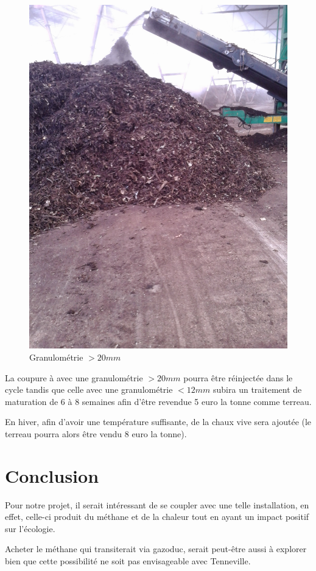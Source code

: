 \documentclass{article}
\begin{document}
\begin{figure}
  \centering
  \includegraphics[scale=0.07]{IMG_20141105_103019.jpg}
  \caption{Granulométrie $> \unit{20}{mm}$}
  \label{fig:granumore20}
\end{figure}
La coupure à avec une granulométrie $> \unit{20}{mm}$ pourra être réinjectée dans le cycle tandis que celle avec une granulométrie $< \unit{12}{mm}$ subira un traitement de maturation de 6 à 8 semaines afin d'être revendue 5 euro la tonne comme terreau.

En hiver, afin d'avoir une température suffisante, de la chaux vive sera ajoutée (le terreau pourra alors être vendu 8 euro la tonne).
\section{Conclusion}
Pour notre projet, il serait intéressant de se coupler avec une telle installation, en effet, celle-ci produit du méthane et de la chaleur tout en ayant un impact positif sur l'écologie.

Acheter le méthane qui transiterait via gazoduc, serait peut-être aussi à explorer bien que cette possibilité ne soit pas envisageable avec Tenneville.
\end{document}
